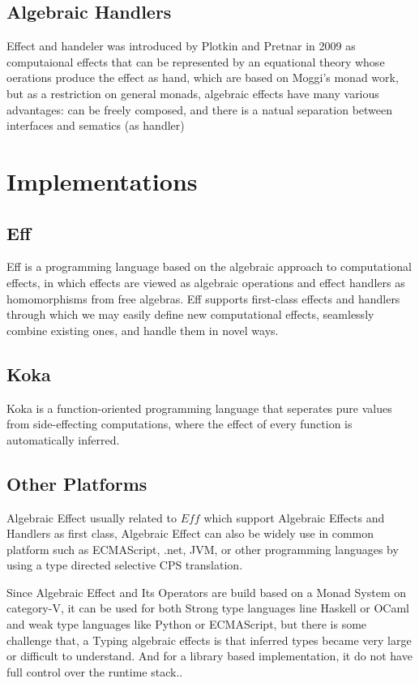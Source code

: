 \documentclass{article}
\begin{document}
\subsection{Algebraic Handlers}
Effect and handeler was introduced by Plotkin and Pretnar in 2009 \cite{lmcs:705} as computaional effects that can be represented by an equational theory whose oerations produce the effect as hand, which are based on Moggi's monad work, but as a restriction on general monads, algebraic effects have many various advantages: can be freely composed, and there is a natual separation between interfaces and sematics (as handler) \cite{algebraic-effects-for-functional-programming}

\section{Implementations}
\subsection{Eff}
 Eff is a programming language based on the algebraic approach to computational effects, in which effects are viewed as algebraic operations and effect handlers as homomorphisms from free algebras.\cite{eff} Eff supports ﬁrst-class effects and handlers through which we may easily deﬁne new computational effects, seamlessly combine existing ones, and handle them in novel ways.


\subsection{Koka}
Koka is a function-oriented programming language that seperates pure values from side-effecting computations, where the effect of every function is automatically inferred.

\subsection{Other Platforms}

Algebraic Effect usually related to $Eff$ which support Algebraic Effects and Handlers as first class,    Algebraic Effect can also be widely use in common platform such as ECMAScript, .net, JVM, or other programming languages by using a type directed selective CPS translation\cite{algebraic-effects-for-functional-programming}.

Since Algebraic Effect and Its Operators are build based on a Monad System on category-V, it can be used for both Strong type languages line Haskell or OCaml and weak type languages like Python or ECMAScript, but there is some challenge that, a Typing algebraic effects is that inferred types became very large or difficult to understand. And for a library based implementation, it do not have full control over the runtime stack.\cite{algebraic-effects-for-functional-programming}.
\end{document}
